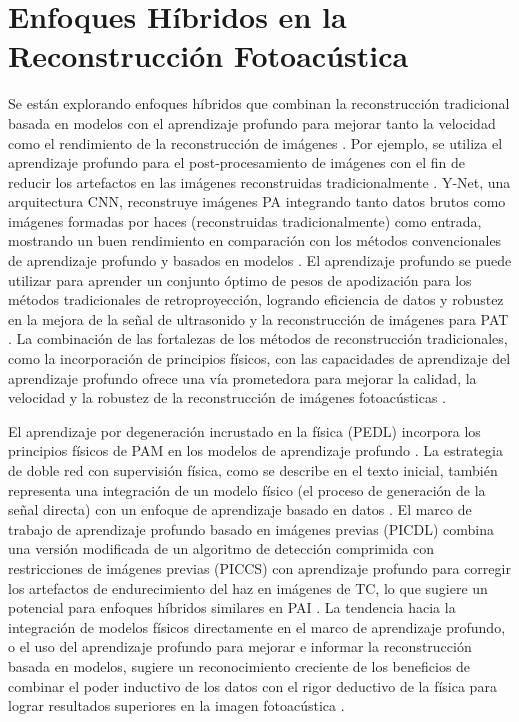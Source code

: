 \section{Enfoques Híbridos en la Reconstrucción Fotoacústica}

Se están explorando enfoques híbridos que combinan la reconstrucción tradicional basada en modelos con el aprendizaje profundo para mejorar tanto la velocidad como el rendimiento de la reconstrucción de imágenes \cite{recent_advances_dl_2023}. Por ejemplo, se utiliza el aprendizaje profundo para el post-procesamiento de imágenes con el fin de reducir los artefactos en las imágenes reconstruidas tradicionalmente \cite{deep_learning_realtime_2021}. Y-Net, una arquitectura CNN, reconstruye imágenes PA integrando tanto datos brutos como imágenes formadas por haces (reconstruidas tradicionalmente) como entrada, mostrando un buen rendimiento en comparación con los métodos convencionales de aprendizaje profundo y basados en modelos \cite{hybrid_neural_network_2020}. El aprendizaje profundo se puede utilizar para aprender un conjunto óptimo de pesos de apodización para los métodos tradicionales de retroproyección, logrando eficiencia de datos y robustez en la mejora de la señal de ultrasonido y la reconstrucción de imágenes para PAT \cite{pa_digital_brain_2023}. La combinación de las fortalezas de los métodos de reconstrucción tradicionales, como la incorporación de principios físicos, con las capacidades de aprendizaje del aprendizaje profundo ofrece una vía prometedora para mejorar la calidad, la velocidad y la robustez de la reconstrucción de imágenes fotoacústicas \cite{hybrid_neural_network_2020}.

El aprendizaje por degeneración incrustado en la física (PEDL) incorpora los principios físicos de PAM en los modelos de aprendizaje profundo \cite{enhanced_pam_2024}. La estrategia de doble red con supervisión física, como se describe en el texto inicial, también representa una integración de un modelo físico (el proceso de generación de la señal directa) con un enfoque de aprendizaje basado en datos \cite{resolution_enhancement_2024}. El marco de trabajo de aprendizaje profundo basado en imágenes previas (PICDL) combina una versión modificada de un algoritmo de detección comprimida con restricciones de imágenes previas (PICCS) con aprendizaje profundo para corregir los artefactos de endurecimiento del haz en imágenes de TC, lo que sugiere un potencial para enfoques híbridos similares en PAI \cite{hybrid_reconstruction_2024}. La tendencia hacia la integración de modelos físicos directamente en el marco de aprendizaje profundo, o el uso del aprendizaje profundo para mejorar e informar la reconstrucción basada en modelos, sugiere un reconocimiento creciente de los beneficios de combinar el poder inductivo de los datos con el rigor deductivo de la física para lograr resultados superiores en la imagen fotoacústica \cite{hybrid_learning_systems_2024}.

